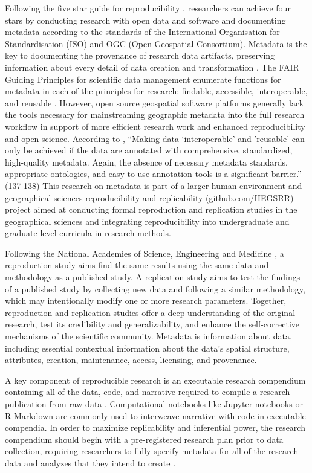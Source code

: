 \documentclass{isprs} %
\begin{document}
Following the five star guide for reproducibility \citep{Wilson2021}, researchers can achieve four stars by conducting research with open data and software and documenting metadata according to the standards of the International Organisation for Standardisation (ISO) and OGC (Open Geospatial Consortium).
Metadata is the key to documenting the provenance of research data artifacts, preserving information about every detail of data creation and transformation \citep{Tullis2021}. The FAIR Guiding Principles for scientific data management enumerate functions for metadata in each of the principles for research: findable, accessible, interoperable, and reusable \citep{Wilkinson2016}.
However, open source geospatial software platforms generally lack the tools necessary for mainstreaming geographic metadata into the full research workflow in support of more efficient research work and enhanced reproducibility and open science.
According to \citet[137-8]{NASEM2018}, ``Making data `interoperable' and 'reusable' can only be achieved if the data are annotated with comprehensive, standardized, high-quality metadata. Again, the absence of necessary metadata standards, appropriate ontologies, and easy-to-use annotation tools is a significant barrier.'' (137-138)
This research on metadata is part of a larger human-environment and geographical sciences reproducibility and replicability (github.com/HEGSRR) project aimed at conducting formal reproduction and replication studies in the geographical sciences and integrating reproducibility into undergraduate and graduate level curricula in research methods.

Following the National Academies of Science, Engineering and Medicine \citep{NASEM2019}, a reproduction study aims find the same results using the same data and methodology as a published study.
A replication study aims to test the findings of a published study by collecting new data and following a similar methodology, which may intentionally modify one or more research parameters.
Together, reproduction and replication studies offer a deep understanding of the original research, test its credibility and generalizability, and enhance the self-corrective mechanisms of the scientific community.
Metadata is information about data, including essential contextual information about the data's spatial structure, attributes, creation, maintenance, access, licensing, and provenance.

A key component of reproducible research is an executable research compendium containing all of the data, code, and narrative required to compile a research publication from raw data \citep{Nust2021}.
Computational notebooks like Jupyter notebooks or R Markdown are commonly used to interweave narrative with code in executable compendia.
In order to maximize replicability and inferential power, the research compendium should begin with a pre-registered research plan prior to data collection, requiring researchers to fully specify metadata for all of the research data and analyzes that they intend to create \citep{Nosek2018}.
\end{document}
